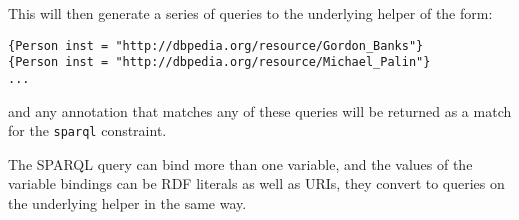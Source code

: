 This will then generate a series of queries to the underlying helper of the
form:
\begin{verbatim}
{Person inst = "http://dbpedia.org/resource/Gordon_Banks"}
{Person inst = "http://dbpedia.org/resource/Michael_Palin"}
...
\end{verbatim}
and any annotation that matches any of these queries will be returned as a
match for the {\tt sparql} constraint.

The SPARQL query can bind more than one variable, and the values of the
variable bindings can be RDF literals as well as URIs, they convert to queries
on the underlying helper in the same way.
